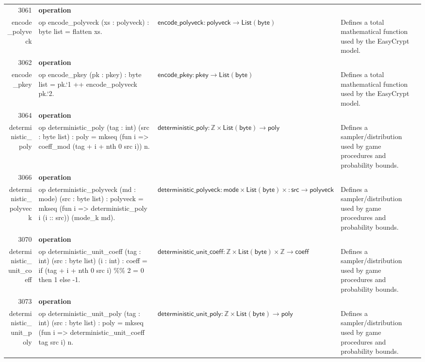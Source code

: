 \documentclass[10pt]{article}
\newcommand{\ec}[1]{\begingroup\ttfamily\scriptsize #1\endgroup}
\begin{document}
\begin{longtable}{r L{0.17\textwidth} L{0.26\textwidth} L{0.27\textwidth} L{0.20\textwidth}}
3061 & \textbf{operation}\\\ec{encode\_polyveck} & \ec{op encode\_polyveck (xs : polyveck) : byte list = flatten xs.} & \(\mathsf{encode\_polyveck} : \mathsf{polyveck} \to \mathsf{List}(\mathsf{byte})\) & Defines a total mathematical function used by the EasyCrypt model. \\
3062 & \textbf{operation}\\\ec{encode\_pkey} & \ec{op encode\_pkey (pk : pkey) : byte list = pk.`1 ++ encode\_polyveck pk.`2.} & \(\mathsf{encode\_pkey} : \mathsf{pkey} \to \mathsf{List}(\mathsf{byte})\) & Defines a total mathematical function used by the EasyCrypt model. \\
3064 & \textbf{operation}\\\ec{deterministic\_poly} & \ec{op deterministic\_poly (tag : int) (src : byte list) : poly = mkseq (fun i => coeff\_mod (tag + i + nth 0 src i)) n.} & \(\mathsf{deterministic\_poly} : \mathbb{Z} \times \mathsf{List}(\mathsf{byte}) \to \mathsf{poly}\) & Defines a sampler/distribution used by game procedures and probability bounds. \\
3066 & \textbf{operation}\\\ec{deterministic\_polyveck} & \ec{op deterministic\_polyveck (md : mode) (src : byte list) : polyveck = mkseq (fun i => deterministic\_poly i (i :: src)) (mode\_k md).} & \(\mathsf{deterministic\_polyveck} : \mathsf{mode} \times \mathsf{List}(\mathsf{byte}) \times \mathsf{: src} \to \mathsf{polyveck}\) & Defines a sampler/distribution used by game procedures and probability bounds. \\
3070 & \textbf{operation}\\\ec{deterministic\_unit\_coeff} & \ec{op deterministic\_unit\_coeff (tag : int) (src : byte list) (i : int) : coeff = if (tag + i + nth 0 src i) \%\% 2 = 0 then 1 else -1.} & \(\mathsf{deterministic\_unit\_coeff} : \mathbb{Z} \times \mathsf{List}(\mathsf{byte}) \times \mathbb{Z} \to \mathsf{coeff}\) & Defines a sampler/distribution used by game procedures and probability bounds. \\
3073 & \textbf{operation}\\\ec{deterministic\_unit\_poly} & \ec{op deterministic\_unit\_poly (tag : int) (src : byte list) : poly = mkseq (fun i => deterministic\_unit\_coeff tag src i) n.} & \(\mathsf{deterministic\_unit\_poly} : \mathbb{Z} \times \mathsf{List}(\mathsf{byte}) \to \mathsf{poly}\) & Defines a sampler/distribution used by game procedures and probability bounds. \\

\end{longtable}
\end{document}
